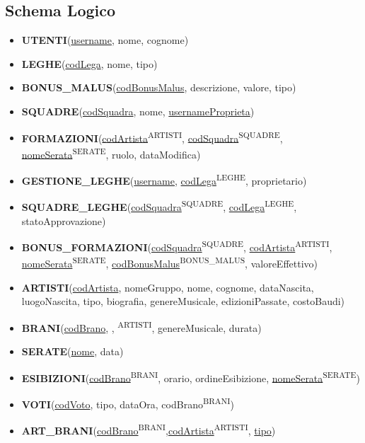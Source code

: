 \documentclass[a4paper,12pt]{article}
\begin{document}
\subsection{Schema Logico}
	\begin{itemize}
		\item \textbf{UTENTI}(\underline{username}, nome, cognome)
		\item \textbf{LEGHE}(\underline{codLega}, nome, tipo)
		\item \textbf{BONUS\_MALUS}(\underline{codBonusMalus}, descrizione, valore, tipo)
		\item \textbf{SQUADRE}(\underline{codSquadra}, nome, \underline{usernameProprieta})
		\item \textbf{FORMAZIONI}(\underline{codArtista}\textsuperscript{ARTISTI}, \underline{codSquadra}\textsuperscript{SQUADRE}, \underline{nomeSerata}\textsuperscript{SERATE}, ruolo, dataModifica)
		
		\item \textbf{GESTIONE\_LEGHE}(\underline{username}, \underline{codLega}\textsuperscript{LEGHE}, proprietario)
		\item \textbf{SQUADRE\_LEGHE}(\underline{codSquadra}\textsuperscript{SQUADRE}, \underline{codLega}\textsuperscript{LEGHE}, statoApprovazione)
		\item \textbf{BONUS\_FORMAZIONI}(\underline{codSquadra}\textsuperscript{SQUADRE}, \underline{codArtista}\textsuperscript{ARTISTI}, \underline{nomeSerata}\textsuperscript{SERATE}, \underline{codBonusMalus}\textsuperscript{BONUS\_MALUS}, valoreEffettivo)
		
		\item \textbf{ARTISTI}(\underline{codArtista}, nomeGruppo, nome, cognome, dataNascita, luogoNascita, tipo, biografia, genereMusicale, edizioniPassate, costoBaudi)
		\item \textbf{BRANI}(\underline{codBrano}, , \textsuperscript{ARTISTI}, genereMusicale, durata)
		\item \textbf{SERATE}(\underline{nome}, data)
		\item \textbf{ESIBIZIONI}(\underline{codBrano}\textsuperscript{BRANI}, orario, ordineEsibizione, \underline{nomeSerata}\textsuperscript{SERATE})
		\item \textbf{VOTI}(\underline{codVoto}, tipo, dataOra, {codBrano}\textsuperscript{BRANI})
		\item \textbf{ART\_BRANI}(\underline{codBrano}\textsuperscript{BRANI},\underline{codArtista}\textsuperscript{ARTISTI}, \underline{tipo}) 
	\end{itemize}
	
\end{document}
